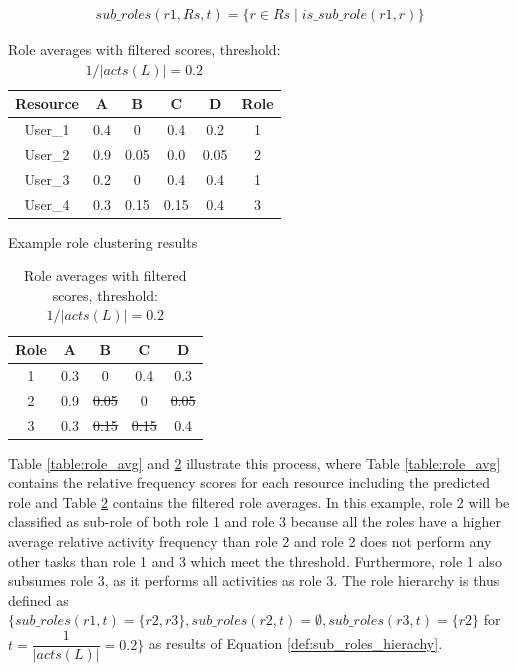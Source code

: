 \begin{equation}\label{def:sub_roles}
  \begin{array}{l}
    sub\_roles({r1},{Rs}, t) = \{r \in Rs \; | \;is\_sub\_role({r1}, {r})\}
  \end{array}
\end{equation}

\begin{table}[h]
  \parbox{.45\linewidth}{
    \centering
    \begin{tabular}{cccccc}
    \hline
    Resource& A & B & C & D & Role\\
    \hline
	User\_1 & 0.4 & 0 & 0.4 & 0.2 & 1 \\
	User\_2 & 0.9 & 0.05 & 0.0 & 0.05  & 2  \\
	User\_3 & 0.2 & 0 & 0.4 & 0.4 & 1 \\
    User\_4 & 0.3 & 0.15 & 0.15 & 0.4 & 3 \\
	\hline
    \end{tabular}
    \caption{Example role clustering results}
    \label{table:role_avg}
  }
\hfill
  \parbox{.45\linewidth}{
    \centering
    \begin{tabular}{ccccc}
    \hline
    Role& A & B & C & D\\
    \hline
	1 & 0.3 & 0 & 0.4 & 0.3 \\
	2 & 0.9 & \sout{0.05} & 0 & \sout{0.05}\\
	3 & 0.3 & \sout{0.15} & \sout{0.15} & 0.4\\
    \hline
  \end{tabular}
  \caption{Role averages with filtered scores, threshold: $1/|acts(L)|=0.2$}
  \label{table:role_avg_filtered}
}
\end{table}

Table \ref{table:role_avg} and \ref{table:role_avg_filtered} illustrate this process, where Table \ref{table:role_avg} contains the relative frequency scores for each resource including the predicted role and Table \ref{table:role_avg_filtered} contains the filtered role averages. In this example, role 2 will be classified as sub-role of both role 1 and role 3 because all the roles have a higher average relative activity frequency than role 2 and role 2 does not perform any other tasks than role 1 and 3 which meet the threshold. Furthermore, role 1 also subsumes role 3, as it performs all activities as role 3. The role hierarchy is thus defined as $\{sub\_roles({r1}, t)=\{{r2},{r3}\}, sub\_roles({r2}, t)=\emptyset, sub\_roles({r3}, t)=\{{r2}\}$ for $t = \dfrac{1}{|acts(L)|}=0.2 \}$ as results of Equation \ref{def:sub_roles_hierachy}.

